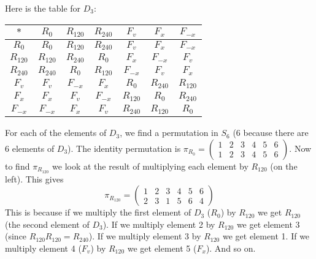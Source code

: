 \documentclass[10pt]{exam}
\renewenvironment{Ans}[1]{\setcounter{question}{#1}\addtocounter{question}{-1}\question }{}
\begin{document}
 \begin{questions}
\begin{Ans}{1}
  Here is the table for $D_3$:

          \def\a{$R_{0}$}
      \def\b{$R_{120}$}
      \def\c{$R_{240}$}
      \def\d{$F_v$}
      \def\e{$F_x$}
      \def\f{$F_{-x}$}

 \begin{tabular}{c|cccccc}
  $\ast$ & \a & \b & \c & \d & \e & \f \\ \hline
  \a & \a & \b & \c & \d & \e & \f \\
  \b & \b & \c & \a & \e & \f & \d \\
  \c & \c & \a & \b & \f & \d & \e \\
  \d & \d & \f & \e & \a & \c & \b \\
  \e & \e & \d & \f & \b & \a & \c \\
  \f & \f & \e & \d & \c & \b & \a
 \end{tabular}

 For each of the elements of $D_3$, we find a permutation in $S_6$ (6 because there are 6 elements of $D_3$). The identity permutation is $\pi_{R_0} = \begin{pmatrix}1 & 2 & 3 & 4 & 5 & 6 \\ 1 & 2 & 3 & 4 & 5 & 6\end{pmatrix}$.   Now to find $\pi_{R_{120}}$ we look at the result of multiplying each element by $R_{120}$ (on the left).  This gives
 \[\pi_{R_{120}} = \begin{pmatrix} 1 & 2 & 3 & 4 & 5 & 6 \\ 2 & 3 & 1 & 5 & 6 & 4\end{pmatrix}\]
 This is because if we multiply the first element of $D_3$ ($R_0$) by $R_{120}$ we get $R_{120}$ (the second element of $D_3$).  If we multiply element 2 by $R_{120}$ we get element 3 (since $R_{120}R_{120} = R_{240}$).  If we multiply element 3 by $R_{120}$ we get element 1.  If we multiply element 4 ($F_{v}$) by $R_{120}$ we get element 5 ($F_x$).  And so on.


\end{Ans}
\end{questions}
\end{document}
